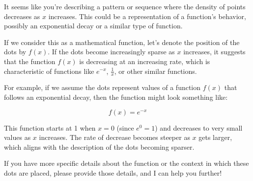 It seems like you're describing a pattern or sequence where the density of points decreases as \(x\) increases. This could be a representation of a function's behavior, possibly an exponential decay or a similar type of function.

If we consider this as a mathematical function, let's denote the position of the dots by \(f(x)\). If the dots become increasingly sparse as \(x\) increases, it suggests that the function \(f(x)\) is decreasing at an increasing rate, which is characteristic of functions like \(e^{-x}\), \(\frac{1}{x}\), or other similar functions.

For example, if we assume the dots represent values of a function \(f(x)\) that follows an exponential decay, then the function might look something like:

\[ f(x) = e^{-x} \]

This function starts at 1 when \(x=0\) (since \(e^0 = 1\)) and decreases to very small values as \(x\) increases. The rate of decrease becomes steeper as \(x\) gets larger, which aligns with the description of the dots becoming sparser.

If you have more specific details about the function or the context in which these dots are placed, please provide those details, and I can help you further!